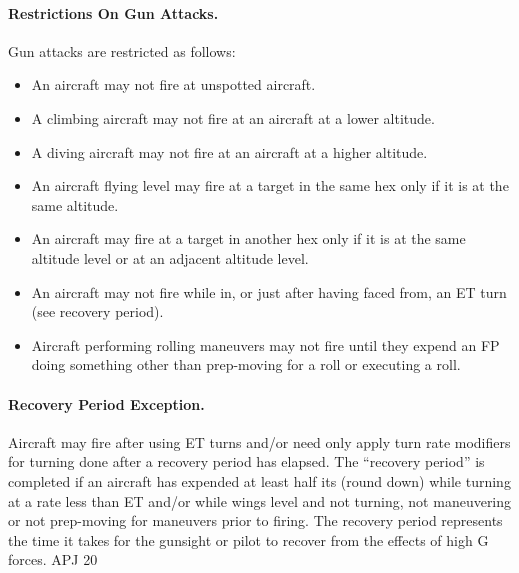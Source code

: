 \paragraph{Restrictions On Gun Attacks.} Gun attacks are restricted as follows:

\begin{itemize}
    \item An aircraft may not fire at unspotted aircraft.
    \item A climbing aircraft may not fire at an aircraft at a lower altitude.
    \item A diving aircraft may not fire at an aircraft at a higher altitude.
    \item An aircraft flying level may fire at a target in the same hex only if it is at the same altitude.
    \item An aircraft  may fire at a target in another hex only if it is at the same altitude level or at an adjacent altitude level.
    \item An aircraft may not fire while in, or just after having faced from, an ET turn (see recovery period).
    \item Aircraft performing rolling maneuvers may not fire until they expend an FP doing something other than prep-moving for a roll or executing a roll.
\end{itemize}


\paragraph{Recovery Period Exception.} Aircraft may fire after using ET turns and/or need only apply turn rate modifiers for turning done after a recovery period has elapsed. The “recovery period” is completed if an aircraft has expended at least half its  (round down) while turning at a rate less than ET and/or while wings level and not turning, not maneuvering or not prep-moving for maneuvers prior to firing. The recovery period represents the time it takes for the gunsight or pilot to recover from the effects of high G forces. 
APJ 20
